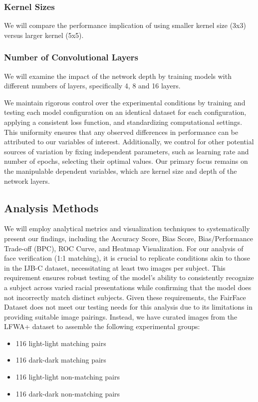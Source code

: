 \documentclass[conference]{IEEEtran}
\begin{document}
\subsubsection{Kernel Sizes}
We will compare the performance implication of using smaller kernel size (3x3) versus larger kernel (5x5).

\subsubsection{Number of Convolutional Layers} 
We will examine the impact of the network depth by training models with different numbers of layers, specifically 4, 8 and 16 layers. 

We maintain rigorous control over the experimental conditions by training and testing each model configuration on an identical dataset for each configuration, applying a consistent loss function, and standardizing computational settings. This uniformity ensures that any observed differences in performance can be attributed to our variables of interest. Additionally, we control for other potential sources of variation by fixing independent parameters, such as learning rate and number of epochs, selecting their optimal values. Our primary focus remains on the manipulable dependent variables, which are kernel size and depth of the network layers.

\subsection{Analysis Methods}
We will employ analytical metrics and visualization techniques to systematically present our findings, including the Accuracy Score, Bias Score, Bias/Performance Trade-off (BPC), ROC Curve, and Heatmap Visualization. For our analysis of face verification (1:1 matching), it is crucial to replicate conditions akin to those in the IJB-C \cite{maze2018iarpa} dataset, necessitating at least two images per subject. This requirement ensures robust testing of the model’s ability to consistently recognize a subject across varied racial presentations while confirming that the model does not incorrectly match distinct subjects. Given these requirements, the FairFace Dataset does not meet our testing needs for this analysis due to its limitations in providing suitable image pairings. Instead, we have curated images from the LFWA+\cite{liu2015faceattributes} dataset to assemble the following experimental groups:

\begin{itemize}
    \item 116 light-light matching pairs
    \item 116 dark-dark matching pairs
    \item 116 light-light non-matching pairs
    \item 116 dark-dark non-matching pairs
\end{itemize}
\end{document}
